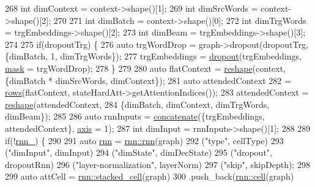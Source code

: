 \begin{DoxyCode}
268     \textcolor{keywordtype}{int} dimContext = context->shape()[1];
269     \textcolor{keywordtype}{int} dimSrcWords = context->shape()[2];
270 
271     \textcolor{keywordtype}{int} dimBatch = context->shape()[0];
272     \textcolor{keywordtype}{int} dimTrgWords = trgEmbeddings->shape()[2];
273     \textcolor{keywordtype}{int} dimBeam = trgEmbeddings->shape()[3];
274 
275     \textcolor{keywordflow}{if}(dropoutTrg) \{
276       \textcolor{keyword}{auto} trgWordDrop = graph->dropout(dropoutTrg, \{dimBatch, 1, dimTrgWords\});
277       trgEmbeddings = \hyperlink{namespacemarian_a268400392f22176821c7c4a36733b178}{dropout}(trgEmbeddings, \hyperlink{namespacemarian_1_1keywords_a201bea6bea8108889b63081132cc3cd7}{mask} = trgWordDrop);
278     \}
279 
280     \textcolor{keyword}{auto} flatContext = \hyperlink{namespacemarian_acd984f43188d0ae23c2a6ef13ae5293f}{reshape}(context, \{dimBatch * dimSrcWords, dimContext\});
281     \textcolor{keyword}{auto} attendedContext
282         = \hyperlink{namespacemarian_ace1e9a63d52edc363d70d661cf8d0257}{rows}(flatContext, stateHardAtt->getAttentionIndices());
283     attendedContext = \hyperlink{namespacemarian_acd984f43188d0ae23c2a6ef13ae5293f}{reshape}(attendedContext,
284                               \{dimBatch, dimContext, dimTrgWords, dimBeam\});
285 
286     \textcolor{keyword}{auto} rnnInputs = \hyperlink{namespacemarian_a2791a2c8f79a938f5cb22ae613680675}{concatenate}(\{trgEmbeddings, attendedContext\}, 
      \hyperlink{namespacemarian_1_1keywords_ace9158eabbddaca833133f12da98b9d6}{axis} = 1);
287     \textcolor{keywordtype}{int} dimInput = rnnInputs->shape()[1];
288 
289     \textcolor{keywordflow}{if}(!\hyperlink{classmarian_1_1DecoderHardSoftAtt_ae077a0f8f32a457c0c2c972ca4251ede}{rnn\_}) \{
290 
291       \textcolor{keyword}{auto} \hyperlink{namespacemarian_1_1rnn_aff1b115e415945b445f8d4a2068ec3e8}{rnn} = \hyperlink{namespacemarian_1_1rnn_aff1b115e415945b445f8d4a2068ec3e8}{rnn::rnn}(graph)
292                  (\textcolor{stringliteral}{"type"}, cellType)
293                  (\textcolor{stringliteral}{"dimInput"}, dimInput)
294                  (\textcolor{stringliteral}{"dimState"}, dimDecState)
295                  (\textcolor{stringliteral}{"dropout"}, dropoutRnn)
296                  (\textcolor{stringliteral}{"layer-normalization"}, layerNorm)
297                  (\textcolor{stringliteral}{"skip"}, skipDepth);
298 
299       \textcolor{keyword}{auto} attCell = \hyperlink{namespacemarian_1_1rnn_a55385034d5ad19187245bb2b564cb7eb}{rnn::stacked\_cell}(graph)
300                      .push\_back(\hyperlink{namespacemarian_1_1rnn_af723e51535e0b11de5b28fe19627a3fb}{rnn::cell}(graph)

\end{DoxyCode}
